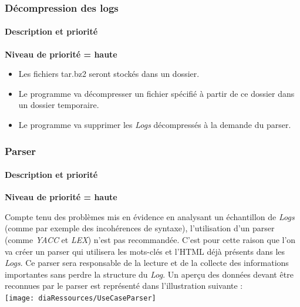 \subsubsection{Décompression des logs}
\paragraph*{Description et priorité} 



\textbf{Niveau de priorité = haute}



\begin{itemize}
  \item Les fichiers tar.bz2 seront stockés dans un dossier.
  \item Le programme va  décompresser un fichier spécifié à partir de ce dossier dans un dossier temporaire.
  \item Le programme va  supprimer les \textit{Logs} décompressés  à la demande du parser.
\end{itemize}

\subsubsection{Parser}

\paragraph*{Description et priorité} 



\textbf{Niveau de priorité = haute}



Compte tenu des problèmes mis en évidence en analysant un échantillon de \textit{Logs} (comme par exemple des incohérences de syntaxe), l'utilisation d'un parser (comme \textit{YACC} et \textit{LEX}) n'est pas recommandée. C'est pour cette raison que l'on va créer un parser qui utilisera les mots-clés et l'HTML déjà présents dans les \textit{Logs}. Ce parser sera responsable de la lecture et de la collecte des informations importantes sans perdre la structure du \textit{Log}.
Un aperçu des données devant être reconnues par le parser est représenté dans l'illustration suivante :\\

\texttt{[image: diaRessources/UseCaseParser]}

